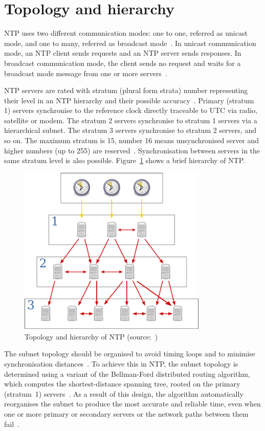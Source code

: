 
\section{Topology and hierarchy}\label{sec:ntp-topology}
NTP uses two different communication modes:
one to one, referred as unicast mode, and one to many, referred as broadcast mode~\cite{rfc5905}.
In unicast communication mode, an NTP client sends requests and an NTP server sends responses.
In broadcast communication mode, the client sends no request
and waits for a broadcast mode message from one or more servers~\cite{rfc5905}.

NTP servers are rated with stratum (plural form strata) number representing their level
in an NTP hierarchy and their possible accuracy~\cite{rfc5905}.
Primary (stratum 1) servers synchronise to the reference clock directly traceable to UTC via
radio, satellite or modem.
The stratum 2 servers synchronise to stratum 1
servers via a hierarchical subnet.
The stratum 3 servers synchronise to stratum 2 servers, and so on.
The maximum stratum is 15, number 16 means unsynchronised server
and higher numbers (up to 255) are reserved~\cite{rfc5905}.
Synchronisation between servers in the same stratum level is also possible.
Figure~\ref{fig:ntp-hierarchy} shows a brief hierarchy of NTP.
\begin{figure}
  \centering
  \includegraphics[width=9cm,keepaspectratio]{fig/Network_Time_Protocol_servers_and_clients.pdf}
  \caption{Topology and hierarchy of NTP (source:~\cite{wikimedia-ntp})}
  \label{fig:ntp-hierarchy}
\end{figure}
The subnet topology should be organised to avoid timing loops
and to minimise synchronisation distances~\cite{rfc5905}.
To achieve this in NTP, the subnet topology is determined using a variant
of the Bellman-Ford distributed routing algorithm, which computes
the shortest-distance spanning tree, rooted on the primary (stratum~1) servers~\cite{rfc5905}.
As a result of this design, the
algorithm automatically reorganises the subnet to produce the most accurate and reliable time,
even when one or more primary or secondary servers or the network paths between them fail~\cite{rfc5905}.
